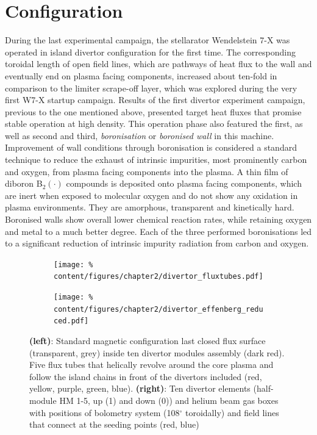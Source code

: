     \section{Configuration}\label{sec:configuration}%
%
        During the last experimental campaign, the stellarator Wendelstein 7-X was operated in island divertor configuration for the first time. The corresponding toroidal length of open field lines, which are pathways of heat flux to the wall and eventually end on plasma facing components, increased about ten-fold in comparison to the limiter scrape-off layer, which was explored during the very first W7-X startup campaign. Results of the first divertor experiment campaign, previous to the one mentioned above, presented target heat fluxes that promise stable operation at high density\cite{Pedersen2018}. This operation phase also featured the first, as well as second and third, \textit{boronisation} or \textit{boronised wall} in this machine. Improvement of wall conditions through boronisation is considered a standard technique to reduce the exhaust of intrinsic impurities, most prominently carbon and oxygen, from plasma facing components into the plasma\cite{Winter1989,Winter1992,Meshcheryakov2005,Bedoya2018,Waelbroeck1989,Lipschultz2007}. A thin film of diboron B$_{2}\left(\cdot\right)$ compounds is deposited onto plasma facing components, which are inert when exposed to molecular oxygen and do not show any oxidation in plasma environments. They are amorphous, transparent and kinetically hard. Boronised walls show overall lower chemical reaction rates, while retaining oxygen and metal to a much better degree\cite{Winter1992}. Each of the three performed boronisations led to a significant reduction of intrinsic impurity radiation from carbon and oxygen\cite{Buttenschon2019}.\\%
%
        \begin{figure}[t]%
            \centering%
            \begin{subfigure}{0.4\textwidth}%
                \texttt{[image: \%
                    content/figures/chapter2/divertor\_fluxtubes.pdf]}%
            \end{subfigure}%
            \hfill%
            \begin{subfigure}{0.56\textwidth}%
                \texttt{[image: \%
                    content/figures/chapter2/divertor\_effenberg\_reduced.pdf]}%
            \end{subfigure}%
            \caption{\textbf{(left)}: Standard magnetic configuration last closed flux surface (transparent, grey) inside ten divertor modules assembly (dark red). Five flux tubes that helically revolve around the core plasma and follow the island chains in front of the divertors included (red, yellow, purple, green, blue)\cite{Reimold2021}. \textbf{(right)}: Ten divertor elements (half-module HM 1-5, up (1) and down (0)) and helium beam gas boxes with positions of bolometry system (108$^{\circ}$ toroidally) and field lines that connect at the seeding points (red, blue)\cite{Effenberg2019_seed}}\label{fig:divertors_fluxtubes}%
        \end{figure}%
